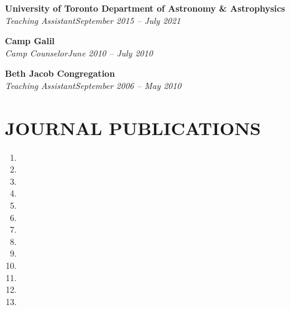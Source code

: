 \documentclass[10pt]{res} %
\begin{document}
\begin{resume}
\textbf{University of Toronto Department of Astronomy \& Astrophysics}\\
{\sl Teaching Assistant}\hfill{\sl September 2015 -- July 2021}%


\textbf{Camp Galil}\\
{\sl Camp Counselor}\hfill{\sl June 2010 -- July 2010}



\textbf{Beth Jacob Congregation}\\
{\sl Teaching Assistant}\hfill{\sl September 2006 -- May 2010}





 
\section{JOURNAL PUBLICATIONS}

\begin{enumerate}
\item {}
\item {}
\item {}
\item {}
\item {}
\item {}
\item {}
\item {}
\item {}
\item {}
\item {}
\item {}
\item {}
\end{enumerate}
% 



\end{resume}
\end{document}
